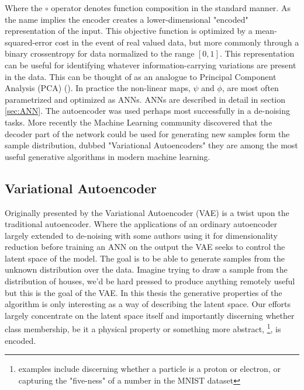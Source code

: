\noindent  Where the $\circ$ operator denotes function composition in the standard manner. As the name implies the encoder creates a lower-dimensional "encoded" representation of the input. This objective function is optimized by a mean-squared-error cost in the event of real valued data, but more commonly through a binary crossentropy for data normalized to the range $[0, 1]$.
This representation can be useful for identifying whatever information-carrying variations are present in the data. This can be thought of as an analogue to Principal Component Analysis (PCA) (\cite{Marsland2009}). In practice the non-linear maps, $\psi$ and $\phi$, are most often parametrized and optimized as ANNs. ANNs are described in detail in section \ref{sec:ANN}. The autoencoder was used perhaps most successfully in a de-noising tasks. 
More recently the Machine Learning community discovered that the decoder part of the network could be used for generating
new samples form the sample distribution, dubbed "Variational Autoencoders" they are among the most useful generative algorithms in modern machine learning.

\subsection{Variational Autoencoder}

Originally presented by \citet{Kingma2013} the Variational Autoencoder (VAE) is a twist upon the traditional autoencoder. Where the applications of an ordinary autoencoder largely extended to de-noising with some authors using it for dimensionality reduction before training an ANN on the output the VAE seeks to control the latent space of the model. The goal is to be able to generate samples from the unknown distribution over the data. Imagine trying to draw a sample from the distribution of houses, we'd be hard pressed to produce anything remotely useful but this is the goal of the VAE. In this thesis the generative properties of the algorithm is only interesting as a way of describing the latent space. Our efforts largely concentrate on the latent space itself and importantly discerning whether class membership, be it a physical property or something more abstract, \footnote{examples include discerning whether a particle is  a proton or electron, or capturing the "five-ness" of a number in the MNIST dataset}, is encoded.

